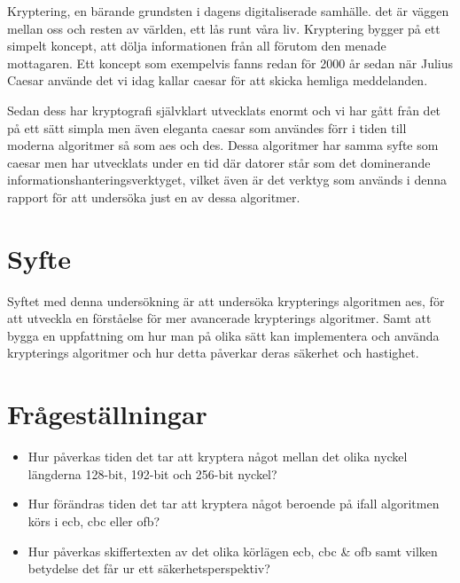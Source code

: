 Kryptering, en bärande grundsten i dagens digitaliserade samhälle. det är väggen mellan oss och resten
av världen, ett lås runt våra liv. Kryptering bygger på ett simpelt koncept, att dölja informationen
från all förutom den menade mottagaren. Ett koncept som exempelvis fanns redan för 2000 år sedan när Julius
Caesar använde det vi idag kallar \gls{caesar} för att skicka hemliga meddelanden.

Sedan dess har kryptografi självklart utvecklats enormt och vi har gått från det på ett sätt simpla men
även eleganta \gls{caesar} som användes förr i tiden till moderna algoritmer så som \acrlong{aes} och \acrlong{des}.
Dessa algoritmer har samma syfte som \gls{caesar} men har utvecklats under en tid där datorer står som
det dominerande informationshanteringsverktyget, vilket även är det verktyg som används i denna rapport för att
undersöka just en av dessa algoritmer.

\section{Syfte} %
Syftet med denna undersökning är att undersöka krypterings algoritmen \acrshort{aes},
för att utveckla en förståelse för mer avancerade krypterings algoritmer.
Samt att bygga en uppfattning om hur man på olika sätt kan implementera och använda
krypterings algoritmer och hur detta påverkar deras säkerhet och hastighet.

\section{Frågeställningar} %
\begin{itemize}
    \setlength{\itemindent}{-1em}
    \item Hur påverkas tiden det tar att kryptera något mellan det olika nyckel längderna 128-bit,
          192-bit och 256-bit nyckel?

    \item Hur förändras tiden det tar att kryptera något beroende på ifall algoritmen körs i
          \acrshort{ecb}, \acrshort{cbc} eller \acrshort{ofb}?

    \item Hur påverkas skiffertexten av det olika körlägen \acrshort{ecb}, \acrshort{cbc} \& \acrshort{ofb}
          samt vilken betydelse det får ur ett säkerhetsperspektiv?
\end{itemize}

